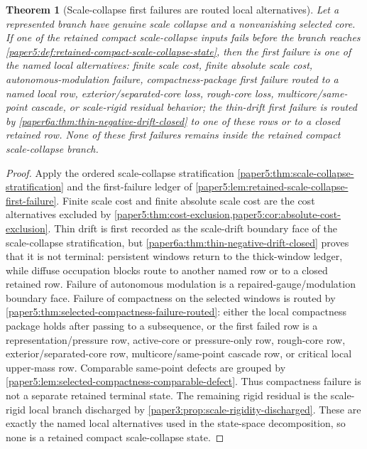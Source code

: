 \documentclass[11pt]{amsart}
\theoremstyle{plain}
\newtheorem{theorem}{Theorem}[section]
\theoremstyle{definition}
\theoremstyle{remark}
\begin{document}
\begin{theorem}[Scale-collapse first failures are routed local alternatives]
\label{paper5:thm:scale-collapse-first-failure-closure}
Let a represented branch have genuine scale collapse and a nonvanishing
selected core.  If one of the retained compact scale-collapse inputs fails
before the branch reaches
\cref{paper5:def:retained-compact-scale-collapse-state}, then the first failure
is one of the named local alternatives: finite scale cost, finite absolute
scale cost, autonomous-modulation failure, compactness-package first failure
routed to a named local row,
exterior/separated-core loss, rough-core loss, multicore/same-point cascade, or
scale-rigid residual behavior; the thin-drift first failure is routed by
\cref{paper6a:thm:thin-negative-drift-closed} to one of these rows or to a
closed retained row.  None of these first failures remains inside the retained
compact scale-collapse branch.
\end{theorem}

\begin{proof}
Apply the ordered scale-collapse stratification
\cref{paper5:thm:scale-collapse-stratification} and the first-failure ledger of
\cref{paper5:lem:retained-scale-collapse-first-failure}.  Finite scale cost and
finite absolute scale cost are the cost alternatives excluded by
\cref{paper5:thm:cost-exclusion,paper5:cor:absolute-cost-exclusion}.  Thin
drift is first recorded as the scale-drift boundary face of the scale-collapse
stratification, but
\cref{paper6a:thm:thin-negative-drift-closed} proves that it is not terminal:
persistent windows return to the thick-window ledger, while diffuse occupation
blocks route to another named row or to a closed retained row.  Failure of
autonomous modulation is a
repaired-gauge/modulation boundary face.  Failure
of compactness on the selected windows is routed by
\cref{paper5:thm:selected-compactness-failure-routed}: either the local
compactness package holds after passing to a subsequence, or the first failed
row is a representation/pressure row, active-core or pressure-only row,
rough-core row, exterior/separated-core row, multicore/same-point cascade row,
or critical local upper-mass row.  Comparable same-point defects are grouped by
\cref{paper5:lem:selected-compactness-comparable-defect}.  Thus compactness
failure is not a separate retained terminal state.  The
remaining rigid residual is the scale-rigid local branch discharged by
\cref{paper3:prop:scale-rigidity-discharged}.  These are exactly the named
local alternatives used in the state-space decomposition, so none is a
retained compact scale-collapse state.
\end{proof}
\end{document}
